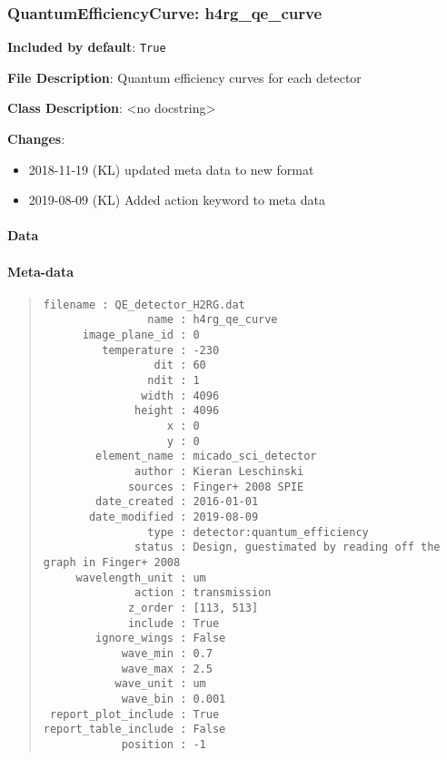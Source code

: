 \subsubsection{QuantumEfficiencyCurve: \textquotedbl{}h4rg\_qe\_curve\textquotedbl{}%
  \label{quantumefficiencycurve-h4rg-qe-curve}%
}

\textbf{Included by default}: \texttt{True}

\textbf{File Description}: Quantum efficiency curves for each detector

\textbf{Class Description}: <no docstring>

\textbf{Changes}:

\begin{itemize}
\item 2018-11-19 (KL) updated meta data to new format

\item 2019-08-09 (KL) Added action keyword to meta data
\end{itemize}


\paragraph{Data%
  \label{id1}%
}

\begin{figure}[H]
\noindent{}\label{fig-h4rg-qe-curve}
\end{figure}


\paragraph{Meta-data%
  \label{id2}%
}

\begin{quote}
\begin{alltt}
\begin{lstlisting}[frame=single]
            filename : QE_detector_H2RG.dat
                name : h4rg_qe_curve
      image_plane_id : 0
         temperature : -230
                 dit : 60
                ndit : 1
               width : 4096
              height : 4096
                   x : 0
                   y : 0
        element_name : micado_sci_detector
              author : Kieran Leschinski
             sources : Finger+ 2008 SPIE
        date_created : 2016-01-01
       date_modified : 2019-08-09
                type : detector:quantum_efficiency
              status : Design, guestimated by reading off the graph in Finger+ 2008
     wavelength_unit : um
              action : transmission
             z_order : [113, 513]
             include : True
        ignore_wings : False
            wave_min : 0.7
            wave_max : 2.5
           wave_unit : um
            wave_bin : 0.001
 report_plot_include : True
report_table_include : False
            position : -1
\end{lstlisting}
\end{alltt}
\end{quote}


